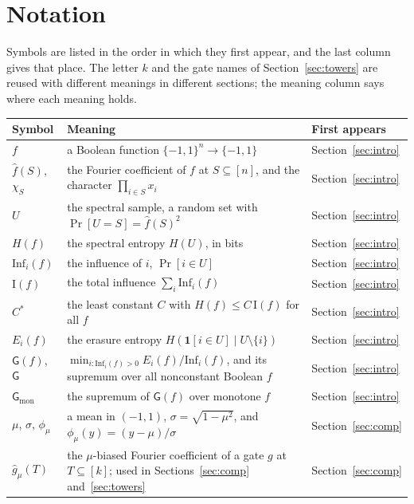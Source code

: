 \documentclass[11pt]{amsart}
\theoremstyle{definition}
\theoremstyle{remark}
\newcommand{\Inf}{\mathrm{Inf}}
\newcommand{\G}{\mathsf{G}}
\begin{document}
\appendix
\section{Notation}\label{app:notation}

Symbols are listed in the order in which they first appear, and the last column gives that place. The letter $k$ and the gate names of Section~\ref{sec:towers} are reused with different meanings in
different sections; the meaning column says where each meaning holds.

\begin{longtable}{@{}>{\raggedright\arraybackslash}p{}>{\raggedright\arraybackslash}p{}>{\raggedright\arraybackslash}p{}@{}}
\toprule
Symbol & Meaning & First appears \\
\midrule
\endhead
$f$ & a Boolean function $\{-1,1\}^n\to\{-1,1\}$ & Section~\ref{sec:intro} \\
$\hat f(S)$, $\chi_S$ & the Fourier coefficient of $f$ at $S\subseteq[n]$, and the character $\prod_{i\in S}x_i$ & Section~\ref{sec:intro} \\
$U$ & the spectral sample, a random set with $\Pr[U=S]=\hat f(S)^2$ & Section~\ref{sec:intro} \\
$H(f)$ & the spectral entropy $H(U)$, in bits & Section~\ref{sec:intro} \\
$\Inf_i(f)$ & the influence of $i$, $\Pr[i\in U]$ & Section~\ref{sec:intro} \\
$\mathrm I(f)$ & the total influence $\sum_i\Inf_i(f)$ & Section~\ref{sec:intro} \\
$C^\ast$ & the least constant $C$ with $H(f)\le C\,\mathrm I(f)$ for all $f$ & Section~\ref{sec:intro} \\
$E_i(f)$ & the erasure entropy $H(\mathbf 1[i\in U]\mid U\setminus\{i\})$ & Section~\ref{sec:intro} \\
$\G(f)$, $\G$ & $\min_{i:\Inf_i(f)>0}E_i(f)/\Inf_i(f)$, and its supremum over all nonconstant Boolean $f$ & Section~\ref{sec:intro} \\
$\G_{\mathrm{mon}}$ & the supremum of $\G(f)$ over monotone $f$ & Section~\ref{sec:intro} \\
$\mu$, $\sigma$, $\phi_\mu$ & a mean in $(-1,1)$, $\sigma=\sqrt{1-\mu^2}$, and $\phi_\mu(y)=(y-\mu)/\sigma$ & Section~\ref{sec:comp} \\
$\hat g_\mu(T)$ & the $\mu$-biased Fourier coefficient of a gate $g$ at $T\subseteq[k]$; used in Sections~\ref{sec:comp} and~\ref{sec:towers} & Section~\ref{sec:comp} \\

\end{longtable}
\end{document}
